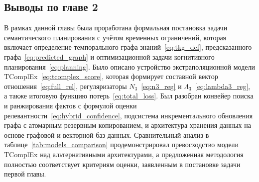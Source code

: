 \subsection*{Выводы по главе 2}

В рамках данной главы была проработана формальная постановка задачи семантического планирования с учётом временных ограничений, которая включает определение темпорального графа знаний~\eqref{eq:tkg_def}, предсказанного графа~\eqref{eq:predicted_graph} и оптимизационной задачи когнитивного планирования~\eqref{eq:planning}. Было описано устройство экстраполяционной модели TComplEx~\eqref{eq:tcomplex_score}, которая формирует составной вектор отношения~\eqref{eq:full_rel}, регуляризаторы $\displaystyle N_3$~\eqref{eq:n3_reg} и $\displaystyle \Lambda_3$~\eqref{eq:lambda3_reg}, а также итоговую функцию потерь~\eqref{eq:total_loss}. Был разобран конвейер поиска и ранжирования фактов с формулой оценки релевантности~\eqref{eq:hybrid_confidence}, подсистема инкрементального обновления графа с атомарным резервным копированием, и архитектура хранения данных на основе графовой и векторной баз данных. Сравнительный анализ в таблице~\ref{tab:models_comparison} продемонстрировал превосходство модели TComplEx над альтернативными архитектурами, а предложенная методология полностью соответствует критериям оценки, заявленным в постановке задачи первой главы.